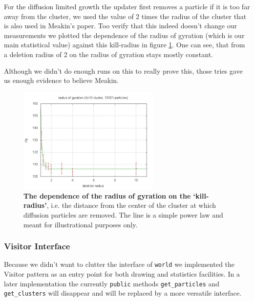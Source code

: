 \documentclass[twocolumn,10pt]{scrartcl}
\begin{document}
                For the diffusion limited growth the updater first removes a particle if it is too far away from the
                cluster, we used the value of 2 times the radius of the cluster that is also used in Meakin's paper. Too
                verify that this indeed doesn't change our measurements we plotted the dependence of the radius of
                gyration (which is our main statistical value) against this kill-radius in figure \ref{fig-killradius}.
                One can see, that from a deletion radius of 2 on the radius of gyration stays mostly constant.
                
                Although we didn't do enough runs on this to really prove this, those tries gave us enough evidence to
                believe Meakin.
                \begin{figure}
                    \center
                    \includegraphics[width=7cm]{img/killradius.jpg}
                    \caption[The dependence of the radius of gyration on the `kill-radius']
                        {\small\textbf{The dependence of the radius of gyration on the `kill-radius'}, i.e. the distance
                        from the center of the cluster at which diffusion particles are removed. The line is a simple power
                        law and meant for illustrational purposes only.}
                    \label{fig-killradius}
                \end{figure}

            \subsubsection{Visitor Interface}
                Because we didn't want to clutter the interface of \lstinline'world' we implemented the Visitor
                pattern\cite{bib-visitor} as an entry point for both drawing and statistics facilities. In a later
                implementation the currently \lstinline'public' methods \lstinline'get_particles' and
                \lstinline'get_clusters' will disappear and will be replaced by a more versatile interface.
\end{document}
